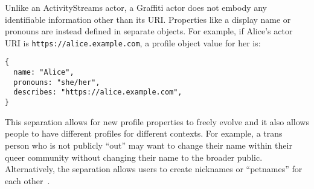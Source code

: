 Unlike an ActivityStreams actor, a Graffiti actor does not embody
any identifiable information other than its
URI.
Properties like a display name or pronouns are instead
defined in separate objects.
For example, if Alice's actor URI is
\texttt{https://\allowbreak{}alice.\allowbreak{}example.\allowbreak{}com}, a profile object value for her is:
\begin{verbatim}
{
  name: "Alice",
  pronouns: "she/her",
  describes: "https://alice.example.com",
}
\end{verbatim}

This separation allows for new profile
properties to freely evolve
and it also allows people to have different profiles for different contexts.
For example, a trans person who is not publicly ``out'' may want to
change their name within their queer community without
changing their name to the broader public.
Alternatively, the separation allows users to create nicknames
or ``petnames'' for each other~\cite{petnames}.




